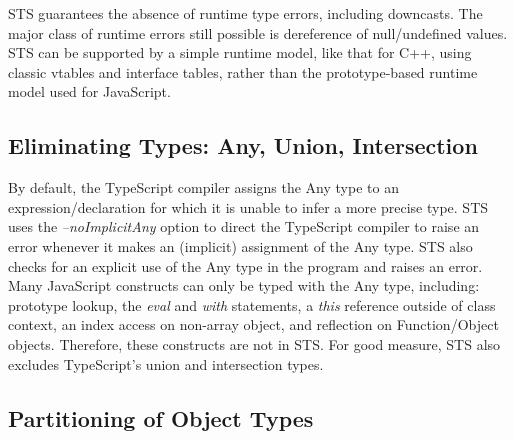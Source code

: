 STS guarantees the absence of runtime type errors, including downcasts.
The major class of runtime errors still possible is dereference of null/undefined values. 
STS can be supported by a simple runtime model, like that for C++, using classic vtables and interface tables,
rather than the prototype-based runtime model used for JavaScript.

\subsection{Eliminating Types: Any, Union, Intersection}

By default, the TypeScript compiler assigns the Any type to an expression/declaration for which it is unable to 
infer a more precise type. STS uses the \emph{--noImplicitAny} option to direct the TypeScript compiler to raise an error 
whenever it makes an (implicit) assignment of the Any type.  STS also checks for an explicit use of the Any type in
the program and raises an error. Many JavaScript constructs can only be typed with the Any type, including: prototype lookup,
the \emph{eval} and \emph{with} statements, a \emph{this} reference outside of class context, an index access on non-array object, and
reflection on Function/Object objects. Therefore, these constructs are not in STS. For good measure,
STS also excludes TypeScript's union and intersection types.

\subsection{Partitioning of Object Types}

